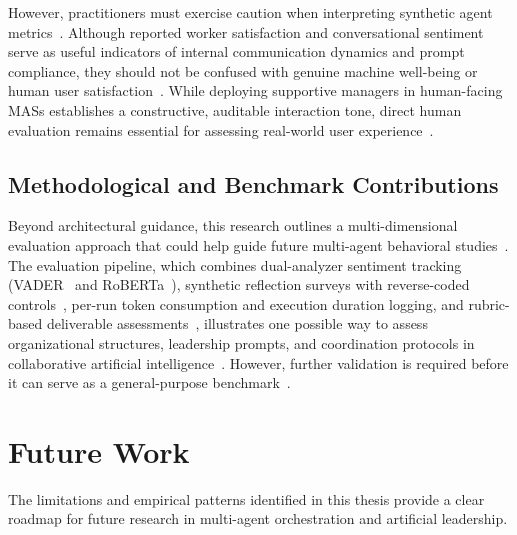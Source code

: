 However, practitioners must exercise caution when interpreting synthetic agent metrics~\cite{dominguezolmedo2024questioningsurveyresponseslarge, samuel2025personagymevaluatingpersonaagents}.
Although reported worker satisfaction and conversational sentiment serve as useful indicators of internal communication dynamics and prompt compliance, they should not be confused with genuine machine well-being or human user satisfaction~\cite{shanahan2023roleplaylargelanguagemodels, dominguezolmedo2024questioningsurveyresponseslarge}.
While deploying supportive managers in human-facing \acp{MAS} establishes a constructive, auditable interaction tone, direct human evaluation remains essential for assessing real-world user experience~\cite{amershi2019humanaiinteraction, lai2021sciencehumanaidecisionmaking, almutairi2025taifaautomatedfeedback}.

\subsection{Methodological and Benchmark Contributions}

Beyond architectural guidance, this research outlines a multi-dimensional evaluation approach that could help guide future multi-agent behavioral studies~\cite{yehudai2026surveyevaluationllmbasedagents, muralidharan2025lessonshumanteamsapplied}.
The evaluation pipeline, which combines dual-analyzer sentiment tracking (\ac{VADER}~\cite{hutto2014vader} and \ac{RoBERTa}~\cite{loureiro2022timelmsdiachroniclanguagemodels}), synthetic reflection surveys with reverse-coded controls~\cite{dominguezolmedo2024questioningsurveyresponseslarge}, per-run token consumption and execution duration logging, and rubric-based deliverable assessments~\cite{chen2025multiagentasjudgealigningllmagentbasedautomated}, 
illustrates one possible way to assess organizational structures, leadership prompts, and coordination protocols in collaborative artificial intelligence~\cite{kwak2026leadershipcoordinationcontrolbehavioral}.
However, further validation is required before it can serve as a general-purpose benchmark~\cite{yehudai2026surveyevaluationllmbasedagents, samuel2025personagymevaluatingpersonaagents}.

\section{Future Work}
\label{sec:future-work}

The limitations and empirical patterns identified in this thesis provide a clear roadmap for future research in multi-agent orchestration and artificial leadership.

